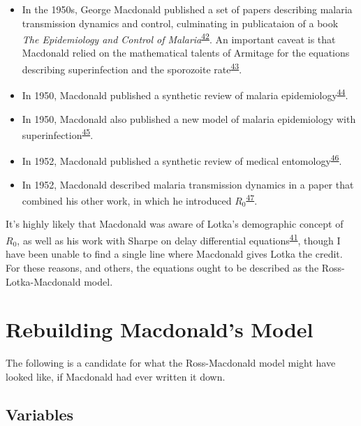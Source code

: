 \documentclass[
]{book}
\begin{document}
\begin{itemize}
\item
  In the 1950s, George Macdonald published a set of papers describing malaria transmission dynamics and control, culminating in publicataion of a book \emph{The Epidemiology and Control of Malaria}\textsuperscript{\protect\hyperlink{ref-MacdonaldG1957Book}{42}}. An important caveat is that Macdonald relied on the mathematical talents of Armitage for the equations describing superinfection and the sporozoite rate\textsuperscript{\protect\hyperlink{ref-ArmitageP1953}{43}}.
\item
  In 1950, Macdonald published a synthetic review of malaria epidemiology\textsuperscript{\protect\hyperlink{ref-MacdonaldG1950Epidemiology}{44}}.
\item
  In 1950, Macdonald also published a new model of malaria epidemiology with superinfection\textsuperscript{\protect\hyperlink{ref-MacdonaldG1950Superinfection}{45}}.
\item
  In 1952, Macdonald published a synthetic review of medical entomology\textsuperscript{\protect\hyperlink{ref-MacdonaldG1952Sporozoite}{46}}.
\item
  In 1952, Macdonald described malaria transmission dynamics in a paper that combined his other work, in which he introduced \(R_0\)\textsuperscript{\protect\hyperlink{ref-MacdonaldG1952R0}{47}}.
\end{itemize}

It's highly likely that Macdonald was aware of Lotka's demographic concept of \(R_0\), as well as his work with Sharpe on delay differential equations\textsuperscript{\protect\hyperlink{ref-LotkaAJ1923part4}{41}}, though I have been unable to find a single line where Macdonald gives Lotka the credit. For these reasons, and others, the equations ought to be described as the Ross-Lotka-Macdonald model.

\hypertarget{rebuilding-macdonalds-model}{%
\section{Rebuilding Macdonald's Model}\label{rebuilding-macdonalds-model}}

The following is a candidate for what the Ross-Macdonald model might have looked like, if Macdonald had ever written it down.

\hypertarget{variables}{%
\subsection{Variables}\label{variables}}
\end{document}
